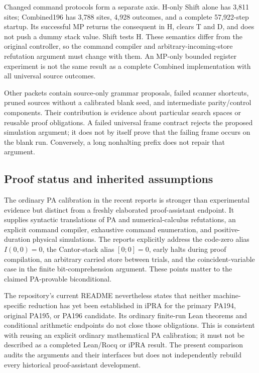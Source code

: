 Changed command protocols form a separate axis. H-only Shift alone has
3,811 sites; Combined196 has 3,788 sites, 4,928 outcomes, and a complete
57,922-step startup. Its successful MP returns the consequent in H,
clears T and D, and does not push a dummy stack value. Shift tests H.
These semantics differ from the original controller, so the command
compiler and arbitrary-incoming-store refutation argument must change
with them. An MP-only bounded register experiment is not the same result
as a complete Combined implementation with all universal source outcomes.

Other packets contain source-only grammar proposals, failed scanner
shortcuts, pruned sources without a calibrated blank seed, and
intermediate parity/control components. Their contribution is evidence
about particular search spaces or reusable proof obligations. A failed
universal frame contract rejects the proposed simulation argument; it
does not by itself prove that the failing frame occurs on the blank run.
Conversely, a long nonhalting prefix does not repair that argument.

\subsection{Proof status and inherited assumptions}

The ordinary PA calibration in the recent reports is stronger than
experimental evidence but distinct from a freshly elaborated proof-assistant
endpoint. It supplies syntactic translations of PA and numerical-calculus
refutations, an explicit command compiler, exhaustive command enumeration,
and positive-duration physical simulations. The reports explicitly address
the code-zero alias $I(0,0)=0$, the Cantor-stack alias $[0;0]=0$, early
halts during proof compilation, an arbitrary carried store between trials,
and the coincident-variable case in the finite bit-comprehension argument.
These points matter to the claimed PA-provable biconditional.

The repository's current README nevertheless states that neither
machine-specific reduction has yet been established in iPRA for the
primary PA194, original PA195, or PA196 candidate. Its ordinary finite-run
Lean theorems and conditional arithmetic endpoints do not close those
obligations. This is consistent with reusing an explicit ordinary
mathematical PA calibration; it must not be described as a completed
Lean/Rocq or iPRA result. The present comparison audits the arguments and
their interfaces but does not independently rebuild every historical
proof-assistant development.

